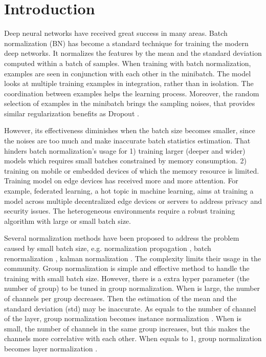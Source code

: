 \documentclass[runningheads]{llncs}
\begin{document}
\section{Introduction}

Deep neural networks have received great success in many areas. Batch normalization (BN) has become a standard technique for training the modern deep networks. 
It normalizes the features by the mean and the standard deviation computed within a batch of samples. 
When training with batch normalization, examples are seen in conjunction with each other in the minibatch. The model looks at multiple training examples in integration, rather than in isolation. The coordination between examples helps the learning process. Moreover, the random selection of examples in the minibatch brings the sampling noises, that provides similar regularization benefits as Dropout \cite{srivastava2014dropout}.


However, its effectiveness diminishes when the batch size becomes smaller, since the noises are too much and make inaccurate batch statistics estimation. That hinders batch normalization’s usage for 
1) training larger (deeper and wider) models which requires small batches constrained by memory consumption. 
2) training on mobile or embedded devices of which the memory resource is limited.
Training model on edge devices has received more and more attention. For example, 
federated learning, a hot topic in machine learning,  aims at training a model across multiple decentralized edge devices or servers to address privacy and security issues. The heterogeneous environments require a robust training algorithm with large or small batch size.
 
Several normalization methods have been proposed to address the problem caused by small batch size, e.g. normalization propagation \cite{arpit2016normalization}, batch renormalization \cite{ioffe2017batch}, kalman normalization \cite{wang2018kalman}. The complexity limits their usage in the community. Group normalization \cite{wu2018group} is simple and effective method to handle the training with small batch size. However, there is a extra hyper parameter  (the number of group) to be tuned in group normalization. When  is large, the number of channels per group decreases. Then the estimation of the mean and the standard deviation (std) may be inaccurate. As  equals to the number of channel of the layer, group normalization becomes instance normalization \cite{ulyanov2016instance}. When  is small, the number of channels in the same group increases, but this makes the channels more correlative with each other. When  equals to 1, group normalization becomes layer normalization \cite{ba2016layer}. 
\end{document}
